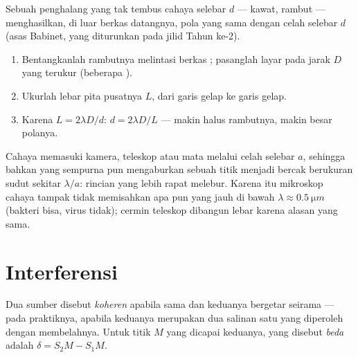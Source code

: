 \begin{proposition}\label{prop:g12:light-as-wave:hair}
Sebuah penghalang  yang tak tembus cahaya selebar $d$ --- kawat,
rambut --- menghasilkan, di luar berkas datangnya, pola yang sama
dengan celah selebar $d$ (asas Babinet, yang diturunkan pada jilid
Tahun ke-2).
\end{proposition}
\admitted

\begin{method}\label{met:g12:light-as-wave:hairwidth}
\begin{enumerate}
  \item Bentangkanlah rambutnya melintasi berkas ; pasanglah
        layar pada jarak $D$ yang terukur (beberapa ).
  \item Ukurlah lebar pita pusatnya $L$, dari garis gelap ke garis
        gelap.
  \item Karena $L = 2\lambda D/d$: $d = 2\lambda D/L$ --- makin halus
        rambutnya, makin besar polanya.
\end{enumerate}
\end{method}

\begin{remark}\label{rem:g12:light-as-wave:limits}
Cahaya memasuki kamera, teleskop atau mata melalui celah selebar $a$,
sehingga bahkan  yang sempurna pun mengaburkan sebuah titik menjadi
bercak berukuran sudut sekitar $\lambda/a$: rincian yang lebih rapat
melebur. Karena itu mikroskop cahaya tampak tidak memisahkan apa pun
yang jauh di bawah $\lambda \approx
\qty{0.5}{\micro m}$ (bakteri bisa,
virus tidak); cermin teleskop dibangun lebar karena alasan yang sama.
\end{remark}

\section{Interferensi}

\begin{definition}\label{def:g12:light-as-wave:coherent}
Dua sumber  disebut \emph{koheren}
apabila  sama dan keduanya bergetar seirama --- pada
praktiknya, apabila keduanya merupakan dua salinan satu  yang
diperoleh dengan membelahnya. Untuk titik $M$ yang dicapai keduanya,
yang disebut \emph{beda }%
 adalah $\delta = S_2M - S_1M$.
\end{definition}

